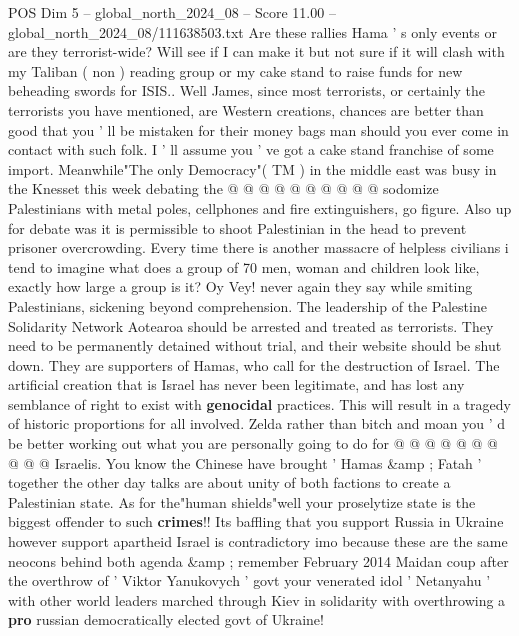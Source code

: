 \begin{textsample}{POS Dim 5 – global\_north\_2024\_08 – Score 11.00 – global\_north\_2024\_08/111638503.txt}
Are these rallies Hama ' s only events or are they terrorist-wide?
Will see if I can make it but not sure if it will clash with my Taliban ( non ) reading group or my cake stand to raise funds for new beheading swords for ISIS..
Well James, since most terrorists, or certainly the terrorists you have mentioned, are Western creations, chances are better than good that you ' ll be mistaken for their money bags man should you ever come in contact with such folk.
I ' ll assume you ' ve got a cake stand franchise of some import.
Meanwhile"The only Democracy"( TM ) in the middle east was busy in the Knesset this week debating the @ @ @ @ @ @ @ @ @ @ sodomize Palestinians with metal poles, cellphones and fire extinguishers, go figure.
Also up for debate was it is permissible to shoot Palestinian in the head to prevent prisoner overcrowding.
Every time there is another massacre of helpless civilians i tend to imagine what does a group of 70 men, woman and children look like, exactly how large a group is it?
Oy Vey! never again they say while smiting Palestinians, sickening beyond comprehension.
The leadership of the Palestine Solidarity Network Aotearoa should be arrested and treated as terrorists.
They need to be permanently detained without trial, and their website should be shut down.
They are supporters of Hamas, who call for the destruction of Israel.
The artificial creation that is Israel has never been legitimate, and has lost any semblance of right to exist with \textbf{genocidal} practices.
This will result in a tragedy of historic proportions for all involved.
Zelda rather than bitch and moan you ' d be better working out what you are personally going to do for @ @ @ @ @ @ @ @ @ @ Israelis.
You know the Chinese have brought ' Hamas \&amp ; Fatah ' together the other day talks are about unity of both factions to create a Palestinian state.
As for the"human shields"well your proselytize state is the biggest offender to such \textbf{crimes}!!
Its baffling that you support Russia in Ukraine however support apartheid Israel is contradictory imo because these are the same neocons behind both agenda \&amp ; remember February 2014 Maidan coup after the overthrow of ' Viktor Yanukovych ' govt your venerated idol ' Netanyahu ' with other world leaders marched through Kiev in solidarity with overthrowing a \textbf{pro} russian democratically elected govt of Ukraine!

\end{textsample}
